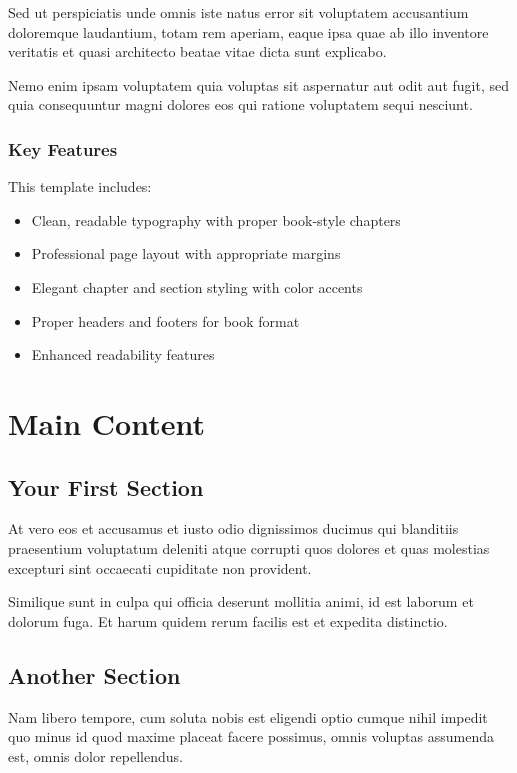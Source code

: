 \documentclass[11pt,twoside,openright]{book}
\begin{document}
Sed ut perspiciatis unde omnis iste natus error sit voluptatem accusantium doloremque laudantium, totam rem aperiam, eaque ipsa quae ab illo inventore veritatis et quasi architecto beatae vitae dicta sunt explicabo.

Nemo enim ipsam voluptatem quia voluptas sit aspernatur aut odit aut fugit, sed quia consequuntur magni dolores eos qui ratione voluptatem sequi nesciunt.

\subsection{Key Features}

This template includes:
\begin{itemize}
    \item Clean, readable typography with proper book-style chapters
    \item Professional page layout with appropriate margins
    \item Elegant chapter and section styling with color accents
    \item Proper headers and footers for book format
    \item Enhanced readability features
\end{itemize}

\chapter{Main Content}

\section{Your First Section}

At vero eos et accusamus et iusto odio dignissimos ducimus qui blanditiis praesentium voluptatum deleniti atque corrupti quos dolores et quas molestias excepturi sint occaecati cupiditate non provident.

Similique sunt in culpa qui officia deserunt mollitia animi, id est laborum et dolorum fuga. Et harum quidem rerum facilis est et expedita distinctio.

\section{Another Section}

Nam libero tempore, cum soluta nobis est eligendi optio cumque nihil impedit quo minus id quod maxime placeat facere possimus, omnis voluptas assumenda est, omnis dolor repellendus.
\end{document}
